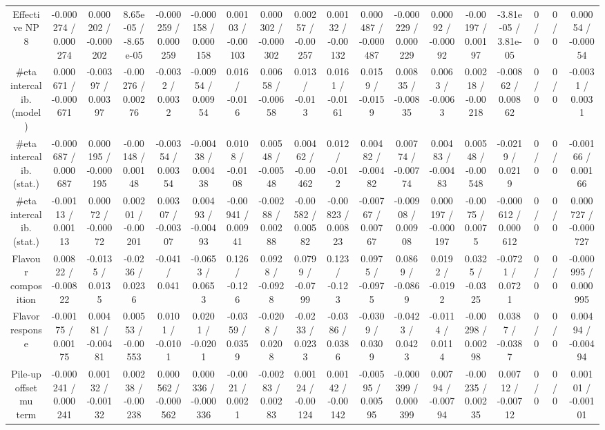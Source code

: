 \documentclass[10pt]{article}
\begin{document}
\begin{table}[htbp]
\begin{center}
\begin{tabular}{|c|c|c|c|c|c|c|c|c|c|c|c|c|c|c|c|c|c|}
  Effective NP 8 & -0.000274 / 0.000274 & 0.000202 / -0.000202 & 8.65e-05 / -8.65e-05 & -0.000259 / 0.000259 & -0.000158 / 0.000158 & 0.00103 / -0.00103 & 0.000302 / -0.000302 & 0.00257 / -0.00257 & 0.00132 / -0.00132 & 0.000487 / -0.000487 & -0.000229 / 0.000229 & 0.00092 / -0.00092 & -0.00197 / 0.00197 & -3.81e-05 / 3.81e-05 & 0 / 0 & 0 / 0 & 0.00054 / -0.00054 \\ 
  #eta intercalib. (model) & 0.000671 / -0.000671 & -0.00397 / 0.00397 & -0.00276 / 0.00276 & -0.0032 / 0.0032 & -0.00954 / 0.00954 & 0.016 / -0.016 & 0.00658 / -0.00658 & 0.013 / -0.013 & 0.0161 / -0.0161 & 0.0159 / -0.0159 & 0.00835 / -0.00835 & 0.0063 / -0.0063 & 0.00218 / -0.00218 & -0.00862 / 0.00862 & 0 / 0 & 0 / 0 & -0.0031 / 0.0031 \\ 
  #eta intercalib. (stat.) & -0.000687 / 0.000687 & 0.000195 / -0.000195 & -0.00148 / 0.00148 & -0.00354 / 0.00354 & -0.00438 / 0.00438 & 0.0108 / -0.0108 & 0.00548 / -0.00548 & 0.00462 / -0.00462 & 0.012 / -0.012 & 0.00482 / -0.00482 & 0.00774 / -0.00774 & 0.00483 / -0.00483 & 0.00548 / -0.00548 & -0.0219 / 0.0219 & 0 / 0 & 0 / 0 & -0.00166 / 0.00166 \\ 
  #eta intercalib. (stat.) & -0.00113 / 0.00113 & 0.00072 / -0.00072 & 0.00201 / -0.00201 & 0.00307 / -0.00307 & 0.00493 / -0.00493 & -0.00941 / 0.00941 & -0.00288 / 0.00288 & -0.00582 / 0.00582 & -0.00823 / 0.00823 & -0.00767 / 0.00767 & -0.00908 / 0.00908 & 0.000197 / -0.000197 & -0.0075 / 0.0075 & -0.000612 / 0.000612 & 0 / 0 & 0 / 0 & 0.000727 / -0.000727 \\ 
  Flavour composition & 0.00822 / -0.00822 & -0.0135 / 0.0135 & -0.0236 / 0.0236 & -0.041 / 0.041 & -0.0653 / 0.0653 & 0.126 / -0.126 & 0.0928 / -0.0928 & 0.0799 / -0.0799 & 0.123 / -0.123 & 0.0975 / -0.0975 & 0.0869 / -0.0869 & 0.0192 / -0.0192 & 0.0325 / -0.0325 & -0.0721 / 0.0721 & 0 / 0 & 0 / 0 & -0.000995 / 0.000995 \\ 
  Flavor response & -0.00175 / 0.00175 & 0.00481 / -0.00481 & 0.00553 / -0.00553 & 0.0101 / -0.0101 & 0.0201 / -0.0201 & -0.0359 / 0.0359 & -0.0208 / 0.0208 & -0.0233 / 0.0233 & -0.0386 / 0.0386 & -0.0309 / 0.0309 & -0.0423 / 0.0423 & -0.0114 / 0.0114 & -0.00298 / 0.00298 & 0.0387 / -0.0387 & 0 / 0 & 0 / 0 & 0.00494 / -0.00494 \\ 
  Pile-up offset mu term & -0.000241 / 0.000241 & 0.00132 / -0.00132 & 0.00238 / -0.00238 & 0.000562 / -0.000562 & 0.000336 / -0.000336 & -0.0021 / 0.0021 & -0.00283 / 0.00283 & 0.00124 / -0.00124 & 0.00142 / -0.00142 & -0.00595 / 0.00595 & -0.000399 / 0.000399 & 0.00794 / -0.00794 & -0.00235 / 0.00235 & 0.00712 / -0.00712 & 0 / 0 & 0 / 0 & 0.00101 / -0.00101 \\ 

\end{tabular}
\end{center}
\end{table}
\end{document}
